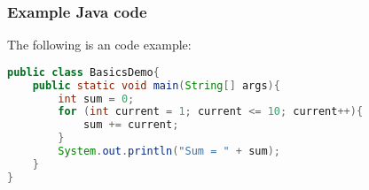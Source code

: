 \subsubsection{Example Java code}
The following is an code example:
\begin{lstlisting}[language=Java]
public class BasicsDemo{
    public static void main(String[] args){
        int sum = 0;
        for (int current = 1; current <= 10; current++){
            sum += current;
        }
        System.out.println("Sum = " + sum);
    }
}
\end{lstlisting}
\doublespacing
